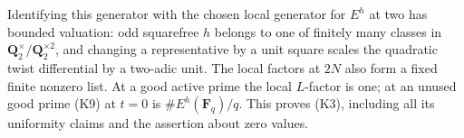 Identifying this generator with the chosen local generator for
$E^h$ at two has bounded valuation: odd squarefree $h$ belongs to
one of finitely many classes in $\mathbf Q_2^\times/\mathbf Q_2^{\times2}$,
and changing a representative by a unit square scales the quadratic
twist differential by a two-adic unit. The local factors at $2N$
also form a fixed finite nonzero list. At a good active prime the
local $L$-factor is one; at an unused good prime (K9) at $t=0$ is
$\#E^h(\mathbf F_q)/q$. This proves (K3), including all its
uniformity claims and the assertion about zero values.

